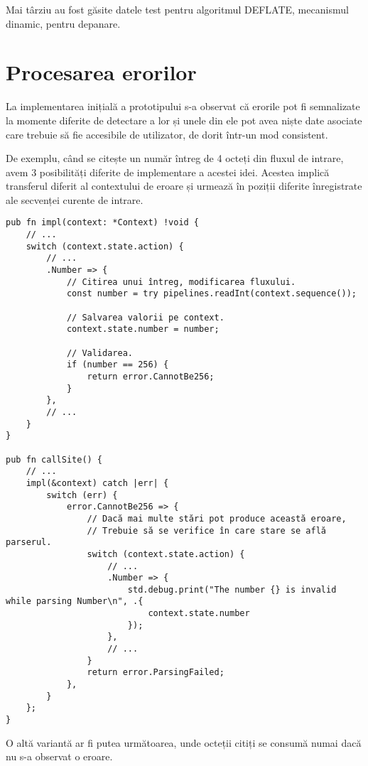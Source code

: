 \documentclass[a4paper,12pt]{report}
\begin{document}
Mai târziu au fost găsite datele test pentru algoritmul DEFLATE,
mecanismul dinamic, pentru depanare\cite{deflate_tests}.

\section{Procesarea erorilor}

La implementarea inițială a prototipului s-a observat că erorile pot fi semnalizate
la momente diferite de detectare a lor și unele din ele pot avea niște date asociate
care trebuie să fie accesibile de utilizator, de dorit într-un mod consistent.

De exemplu, când se citește un număr întreg de 4 octeți din fluxul de intrare,
avem 3 posibilități diferite de implementare a acestei idei.
Acestea implică transferul diferit al contextului de eroare și
urmează în poziții diferite înregistrate ale secvenței curente de intrare.

\begin{verbatim}
pub fn impl(context: *Context) !void {
    // ...
    switch (context.state.action) {
        // ...
        .Number => {
            // Citirea unui întreg, modificarea fluxului.
            const number = try pipelines.readInt(context.sequence());

            // Salvarea valorii pe context.
            context.state.number = number;

            // Validarea.
            if (number == 256) {
                return error.CannotBe256;
            }
        },
        // ...
    }
}

pub fn callSite() {
    // ...
    impl(&context) catch |err| {
        switch (err) {
            error.CannotBe256 => {
                // Dacă mai multe stări pot produce această eroare,
                // Trebuie să se verifice în care stare se află parserul.
                switch (context.state.action) {
                    // ...
                    .Number => {
                        std.debug.print("The number {} is invalid while parsing Number\n", .{
                            context.state.number
                        });
                    },
                    // ...
                }
                return error.ParsingFailed;
            },
        }
    };
}
\end{verbatim}

O altă variantă ar fi putea următoarea, unde octeții citiți
se consumă numai dacă nu s-a observat o eroare.
\end{document}
